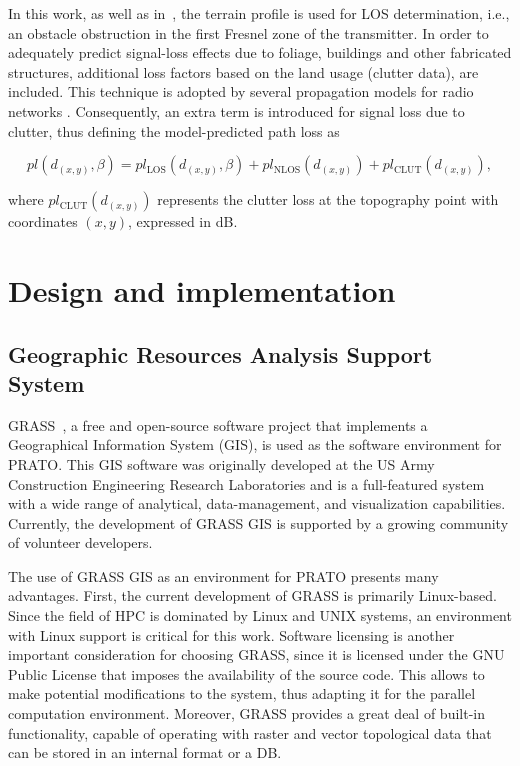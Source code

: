 In this work, as well as in~\cite{Filiposka_Terrain_aware_three_dimensional_radio_propagation_model_extension_for_NS2:2011},
the terrain profile is used for LOS determination, i.e., an obstacle
obstruction in the first Fresnel zone of the transmitter. In order
to adequately predict signal-loss effects due to foliage, buildings
and other fabricated structures, additional loss factors based on
the land usage (clutter data), are included. This technique is adopted
by several propagation models for radio networks \cite{Aarnaes-Tuning_of_empirical_radio_propagation_models_effect_of_location_accuracy:2004,Begovic_Applicability_evaluation_of_Okumura_Ericsson_and_Winner_propagation_models_for_coverage_planning:2012,Neskovic_Microcell_electric_field_strength_prediction_model:2010}.
Consequently, an extra term is introduced for signal loss due to clutter,
thus defining the model-predicted path loss as

\begin{equation}
pl(d_{(x,y)},\beta)=pl_{\mathrm{LOS}}(d_{(x,y)},\beta)+pl_{\mathrm{NLOS}}(d_{(x,y)})+pl_{\mathrm{CLUT}}(d_{(x,y)}),\label{eq:04-Hata_pathloss}
\end{equation}


\noindent where $pl_{\mathrm{CLUT}}(d_{(x,y)})$ represents the clutter
loss at the topography point with coordinates $(x,y)$, expressed
in dB.


\section{Design and implementation \label{sec:04-Design_and_implementation}}


\subsection{Geographic Resources Analysis Support System}

GRASS~\cite{Neteler_Open_source_GIS_a_GRASS_GIS_approach}, a free
and open-source software project that implements a Geographical Information
System (GIS), is used as the software environment for PRATO. This
GIS software was originally developed at the US Army Construction
Engineering Research Laboratories and is a full-featured system with
a wide range of analytical, data-management, and visualization capabilities.
Currently, the development of GRASS GIS is supported by a growing
community of volunteer developers.

The use of GRASS GIS as an environment for PRATO presents many advantages.
First, the current development of GRASS is primarily Linux-based.
Since the field of HPC is dominated by Linux and UNIX systems, an
environment with Linux support is critical for this work. Software
licensing is another important consideration for choosing GRASS, since
it is licensed under the GNU Public License \cite{Stallman_GNU_License:1991}
that imposes the availability of the source code. This allows to make
potential modifications to the system, thus adapting it for the parallel
computation environment. Moreover, GRASS provides a great deal of
built-in functionality, capable of operating with raster and vector
topological data that can be stored in an internal format or a DB.


